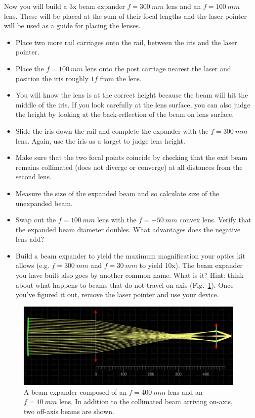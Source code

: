 \documentclass[a4paper]{report}
\begin{document}
Now you will build a 3x beam expander $f=300~mm$ lens and an $f=100~mm$ lens. 
These will be placed at the sum of their focal lengths and the laser pointer will be used as a guide for placing the lenses. 

\begin{itemize}
\item Place two more rail carriages onto the rail, between the iris and the laser pointer. 
\item Place the $f=100~mm$ lens onto the post carriage nearest the laser and position the iris roughly $1f$ from the lens.
\item You will know the lens is at the correct height because the beam will hit the middle of the iris. 
If you look carefully at the lens surface, you can also judge the height by looking at the back-reflection of the beam on lens surface. 
\item Slide the iris down the rail and complete the expander with the $f=300~mm$ lens. Again, use the iris as a target to judge lens height.
\item Make sure that the two focal points coincide by checking that the exit beam remains collimated (does not diverge or converge)
at all distances from the second lens. 
\item Measure the size of the expanded beam and so calculate size of the unexpanded beam.
\item Swap out the $f=100~mm$ lens with the $f=-50~mm$ convex lens. Verify that the expanded beam diameter doubles. 
What advantages does the negative lens add?
\item Build a beam expander to yield the maximum magnification your optics kit allows (e.g. $f=300~mm$ and $f=30~mm$ to yield 10x). 
The beam expander you have built also goes by another common name.  What is it? 
Hint: think about what happens to beams that do not travel on-axis (Fig.~\ref{fig:telescope}).
Once you've figured it out, remove the laser pointer and use your device. 
\end{itemize}


\begin{figure}[h]
\center
\includegraphics[width=4.5in]{telescope_ray_diag.eps}
\caption{A beam expander composed of an $f=400~mm$ lens and an $f=40~mm$ lens. 
In addition to the collimated beam arriving on-axis, two off-axis beams are shown.}
\label{fig:telescope}
\end{figure}
\end{document}
